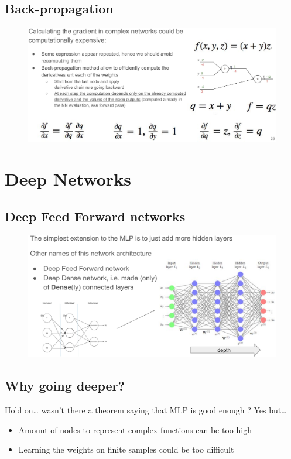 \subsection{Back-propagation}

\begin{figure}[ht]
	\centering
	\includegraphics[width=1\linewidth]{figure_ml/backpropagation.png}
\end{figure}
\FloatBarrier


\section{Deep Networks}

\subsection{Deep Feed Forward networks}

\begin{figure}[ht]
	\centering
	\includegraphics[width=1\linewidth]{figure_ml/dffn.png}
\end{figure}
\FloatBarrier


\subsection{Why going deeper?}
Hold on… wasn’t there a theorem saying that MLP is good enough ? Yes but…
\begin{itemize}
	\item Amount of nodes to represent complex functions can be too high
	\item Learning the weights on finite samples could be too difficult
\end{itemize}

